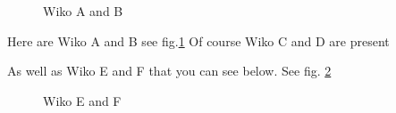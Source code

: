 \documentclass{article}
\begin{document}
\begin{figure}[!ht]
  \captionsetup[subfigure]{labelformat=empty}
  \centering
  \quad
  \caption{Wiko A and B}
  \label{wikoAandB}
\end{figure}

Here are Wiko A  and B  see fig.\ref{wikoAandB}
Of course Wiko C and D are present 

As well as Wiko E and F   that you can see below. See fig. \ref{wikoEandF}

 \begin{figure}[!ht]
  \captionsetup[subfigure]{labelformat=empty}
  \centering
  \quad
  \caption{Wiko E and F}
  \label{wikoEandF}
\end{figure}
\end{document}
